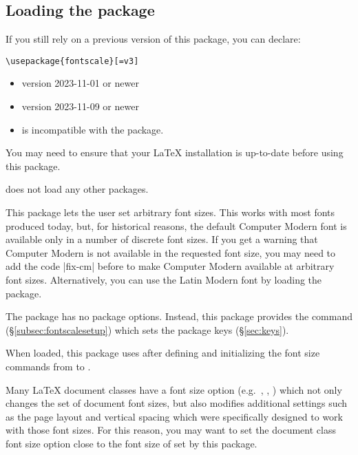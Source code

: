 \documentclass{beery}
\begin{document}
\subsection{Loading the package}
\label{subsec:loading}

If you still rely on a previous version of this package, you can declare:

\begin{verbatim}
\usepackage{fontscale}[=v3]
\end{verbatim}

\begin{itemize}
  \item \LaTeXe{} version 2023-11-01 or newer
  \item {} version 2023-11-09 or newer
  \item {} is incompatible with the  package.
\end{itemize}

You may need to ensure that your \LaTeX{} installation is up-to-date before using this package.

 does not load any other packages.

This package lets the user set arbitrary font sizes.
This works with most fonts produced today, but, for historical reasons, the default Computer Modern font is available only in a number of discrete font sizes.
If you get a warning that Computer Modern is not available in the requested font size, you may need to add the code \allowbreak|{fix-cm}| before  to make Computer Modern available at arbitrary font sizes.
Alternatively, you can use the Latin Modern font by loading the  package.

The  package has no package options.
Instead, this package provides the command  (\S\ref{subsec:fontscalesetup}) which sets the package keys (\S\ref{sec:keys}).

When loaded, this package uses  after defining and initializing the font size commands from  to .

Many \LaTeX{} document classes have a font size option (e.g.\ \key{10pt}, \key{11pt}, \key{12pt}) which not only changes the set of document font sizes, but also modifies additional settings such as the page layout and vertical spacing which were specifically designed to work with those font sizes.
For this reason, you may want to set the document class font size option close to the font size of  set by this package.
\end{document}
